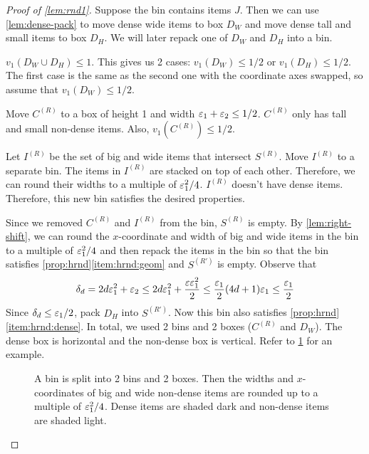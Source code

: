 \begin{proof}[Proof of \cref{lem:rnd1}]
Suppose the bin contains items $J$. Then we can use \cref{lem:dense-pack} to move
dense wide items to box $D_W$ and move dense tall and small items to box $D_H$.
We will later repack one of $D_W$ and $D_H$ into a bin.

$v_1(D_W \cup D_H) \le 1$. This gives us 2 cases:
$v_1(D_W) \le 1/2$ or $v_1(D_H) \le 1/2$.
The first case is the same as the second one with the coordinate axes swapped,
so assume \wLoG{} that $v_1(D_W) \le 1/2$.

Move $C^{(R)}$ to a box of height 1 and width $\varepsilon_1 + \varepsilon_2 \le 1/2$.
$C^{(R)}$ only has tall and small non-dense items. Also, $v_1(C^{(R)}) \le 1/2$.

Let $I^{(R)}$ be the set of big and wide items that intersect $S^{(R)}$.
Move $I^{(R)}$ to a separate bin.
The items in $I^{(R)}$ are stacked on top of each other.
Therefore, we can round their widths to a multiple of $\varepsilon_1^2/4$.
$I^{(R)}$ doesn't have dense items.
Therefore, this new bin satisfies the desired properties.

Since we removed $C^{(R)}$ and $I^{(R)}$ from the bin, $S^{(R)}$ is empty.
By \cref{lem:right-shift}, we can round the $x$-coordinate and width of big and wide items
in the bin to a multiple of $\varepsilon_1^2/4$ and then repack the items in the bin so that
the bin satisfies \cref{prop:hrnd}\ref{item:hrnd:geom} and $S^{(R')}$ is empty.
Observe that
\[ \delta_d = 2d\varepsilon_1^2 + \varepsilon_2
\le 2d\varepsilon_1^2 + \frac{\varepsilon\varepsilon_1^2}{2}
\le \frac{\varepsilon_1}{2} (4d+1)\varepsilon_1 \le \frac{\varepsilon_1}{2} \]
Since $\delta_d \le \varepsilon_1/2$, pack $D_H$ into $S^{(R')}$.
Now this bin also satisfies \cref{prop:hrnd}\ref{item:hrnd:dense}.
In total, we used 2 bins and 2 boxes ($C^{(R)}$ and $D_W$).
The dense box is horizontal and the non-dense box is vertical.
Refer to \cref{fig:split-bin} for an example.
\begin{figure}[htb]
\centering

\caption[Splitting a bin into 2 bins and 2 boxes.]{A bin is split into 2 bins and 2 boxes.
Then the widths and $x$-coordinates of big and wide non-dense items
are rounded up to a multiple of $\varepsilon_1^2/4$.
Dense items are shaded dark and non-dense items are shaded light.}
\label{fig:split-bin}
\end{figure}
\end{proof}

